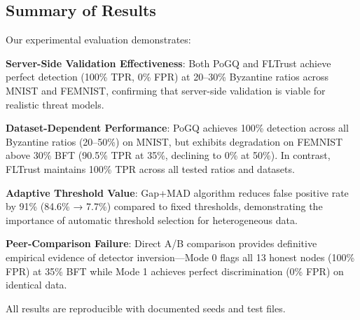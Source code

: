 \subsection{Summary of Results}

Our experimental evaluation demonstrates:

\textbf{Server-Side Validation Effectiveness}: Both PoGQ and FLTrust achieve perfect detection (100\% TPR, 0\% FPR) at 20--30\% Byzantine ratios across MNIST and FEMNIST, confirming that server-side validation is viable for realistic threat models.

\textbf{Dataset-Dependent Performance}: PoGQ achieves 100\% detection across all Byzantine ratios (20--50\%) on MNIST, but exhibits degradation on FEMNIST above 30\% BFT (90.5\% TPR at 35\%, declining to 0\% at 50\%). In contrast, FLTrust maintains 100\% TPR across all tested ratios and datasets.

\textbf{Adaptive Threshold Value}: Gap+MAD algorithm reduces false positive rate by 91\% (84.6\% → 7.7\%) compared to fixed thresholds, demonstrating the importance of automatic threshold selection for heterogeneous data.

\textbf{Peer-Comparison Failure}: Direct A/B comparison provides definitive empirical evidence of detector inversion---Mode 0 flags all 13 honest nodes (100\% FPR) at 35\% BFT while Mode 1 achieves perfect discrimination (0\% FPR) on identical data.

All results are reproducible with documented seeds and test files.
